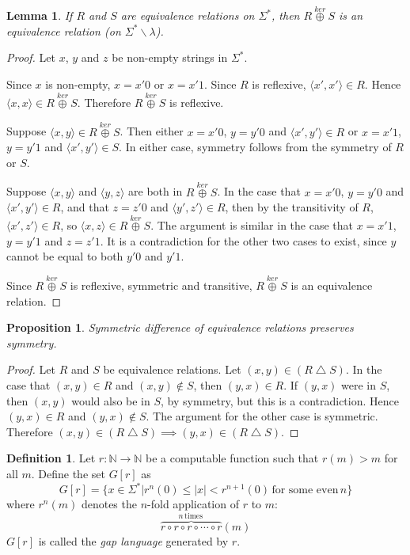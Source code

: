 \documentclass[draft]{article}
\newtheorem{lemma}[lemma]{Lemma}
\newtheorem{proposition}[proposition]{Proposition}
\theoremstyle{definition} \newtheorem{openproblem}[openproblem]{Open problem}
\theoremstyle{definition} \newtheorem{definition}[definition]{Definition}
\theoremstyle{remark} \newtheorem{remark}[remark]{Remark}
\newcommand{\plain}[1]{\,\text{#1}\,} %
\newcommand{\kj}{\overset{ker}{\oplus}} %
\newcommand{\symdiff}{\bigtriangleup} %
\newcommand{\defn}[1]{\emph{#1}} %
\newcommand{\pair}[2]{\langle#1,#2\rangle} %
\begin{document}
\begin{lemma}\label{lem:join}
  If $R$ and $S$ are equivalence relations on $\Sigma^*$, then $R\kj S$ is an equivalence relation (on $\Sigma^*\backslash{\lambda}$).
\end{lemma}
\begin{proof}
  Let $x$, $y$ and $z$ be non-empty strings in $\Sigma^*$.
  
  Since $x$ is non-empty, $x=x'0$ or $x=x'1$.
  Since $R$ is reflexive, $\pair{x'}{x'}\in R$.
  Hence $\pair{x}{x}\in R\kj S$.
  Therefore $R\kj S$ is reflexive.
  
  Suppose $\pair{x}{y}\in R\kj S$.
  Then either $x=x'0$, $y=y'0$ and $\pair{x'}{y'}\in R$ or $x=x'1$, $y=y'1$ and $\pair{x'}{y'}\in S$.
  In either case, symmetry follows from the symmetry of $R$ or $S$.

  Suppose $\pair{x}{y}$ and $\pair{y}{z}$ are both in $R\kj S$.
  In the case that $x=x'0$, $y=y'0$ and $\pair{x'}{y'}\in R$, and that $z=z'0$ and $\pair{y'}{z'}\in R$, then by the transitivity of $R$, $\pair{x'}{z'}\in R$, so $\pair{x}{z}\in R\kj S$.
  The argument is similar in the case that $x=x'1$, $y=y'1$ and $z=z'1$.
  It is a contradiction for the other two cases to exist, since $y$ cannot be equal to both $y'0$ and $y'1$.

  Since $R\kj S$ is reflexive, symmetric and transitive, $R\kj S$ is an equivalence relation.
\end{proof}

\begin{proposition}\label{prop:symdiff}
  Symmetric difference of equivalence relations preserves symmetry.
\end{proposition}
\begin{proof}
  Let $R$ and $S$ be equivalence relations.
  Let $(x,y)\in(R\symdiff S)$.
  In the case that $(x,y)\in R$ and $(x,y)\notin S$, then $(y,x)\in R$.
  If $(y,x)$ were in $S$, then $(x,y)$ would also be in $S$, by symmetry, but this is a contradiction.
  Hence $(y,x)\in R$ and $(y,x)\notin S$.
  The argument for the other case is symmetric.
  Therefore $(x,y)\in(R\symdiff S)\implies (y,x)\in(R\symdiff S)$.
\end{proof}

\begin{definition}
  Let $r\colon\mathbb{N}\to\mathbb{N}$ be a computable function such that $r(m)>m$ for all $m$.
  Define the set $G[r]$ as
  \begin{displaymath}
    G[r]=\{x\in\Sigma^*|r^n(0)\leq|x|<r^{n+1}(0) \plain{for some even} n\}
  \end{displaymath}
  where $r^n(m)$ denotes the $n$-fold application of $r$ to $m$:
  \begin{displaymath}
    \overbrace{r\circ r\circ r\circ\cdots\circ r}^{n \plain{times}}(m)
  \end{displaymath}
  $G[r]$ is called the \defn{gap language} generated by $r$.
\end{definition}
\end{document}
